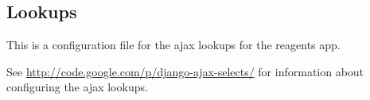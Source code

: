 \documentclass[letterpaper,10pt,english]{sphinxmanual}
\begin{document}

\begin{fulllineitems}
\label{api:experimentdb.reagents.views.index}
\end{fulllineitems}



\subsection{Lookups}
\label{api:id20}\label{api:module-experimentdb.reagents.lookups}
This is a configuration file for the ajax lookups for the reagents app.

See \href{http://code.google.com/p/django-ajax-selects/}{http://code.google.com/p/django-ajax-selects/} for information about configuring the ajax lookups.
\end{document}
